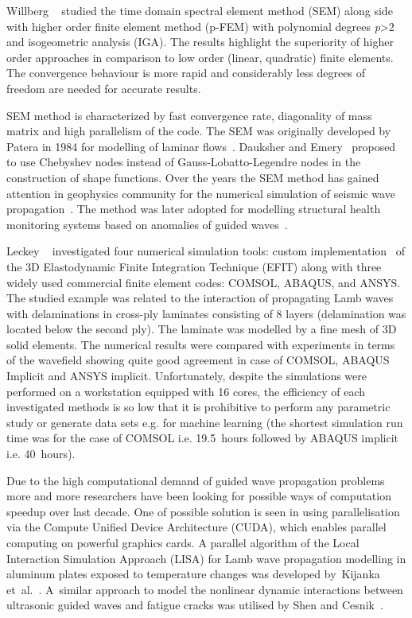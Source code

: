 \documentclass[12pt]{iopart}
\begin{document}
Willberg \etal~\cite{Willberg2012} studied the time domain spectral element method (SEM) along side with higher order finite element method (p-FEM) with polynomial degrees \emph{p}{\textgreater}2 and isogeometric analysis (IGA). The results highlight the superiority of higher order approaches in comparison to low order (linear, quadratic) finite elements. The convergence behaviour is more rapid and considerably less degrees of freedom are needed for accurate results.

SEM method is characterized by fast convergence rate, diagonality of mass matrix and high parallelism of the code. The SEM was originally developed by Patera in 1984 for modelling of laminar flows~\cite{Patera1984}. Dauksher and Emery~\cite{Dauksher1997,Dauksher2000} proposed to use Chebyshev nodes instead of Gauss-Lobatto-Legendre nodes in the construction of shape functions. Over the years the SEM method has gained attention in geophysics community for the numerical simulation of seismic wave propagation~\cite{Seriani1998,Komatitsch2009}. The method was later adopted for modelling structural health monitoring systems based on anomalies of guided waves~\cite{Schulte2010,Ostachowicz2012,Lonkar2013}. 

Leckey \etal~\cite{Leckey2018} investigated four numerical simulation tools: custom implementation~\cite{Leckey2014} of the 3D Elastodynamic Finite Integration Technique (EFIT) \cite{Schubert1998} along with three widely used commercial finite element codes: COMSOL, ABAQUS, and ANSYS. The studied example was related to the interaction of propagating Lamb waves with delaminations in cross-ply laminates consisting of 8 layers (delamination was located below the second ply). The laminate was modelled by a fine mesh of 3D solid elements. The numerical results were compared with experiments in terms of the wavefield showing quite good agreement in case of COMSOL, ABAQUS Implicit and ANSYS implicit. Unfortunately, despite the simulations were performed on a workstation equipped with 16 cores, the efficiency of each investigated methods is so low that it is prohibitive to perform any parametric study or generate data sets e.g. for machine learning (the shortest simulation run time was for the case of COMSOL i.e. 19.5~hours followed by ABAQUS implicit i.e. 40~hours).

Due to the high computational demand of guided wave propagation problems more and more researchers have been looking for possible ways of computation speedup over last decade. One of possible solution is seen in using parallelisation via the Compute Unified Device Architecture (CUDA), which enables parallel computing on powerful graphics cards. A parallel algorithm of the Local Interaction Simulation Approach (LISA) for Lamb wave propagation modelling in aluminum plates exposed to temperature changes was developed by~Kijanka et~al.~\cite{Kijanka2013}. A~similar approach to model the nonlinear dynamic interactions between ultrasonic guided waves and fatigue cracks was utilised by Shen and Cesnik~\cite{Shen2017}.  
\end{document}
